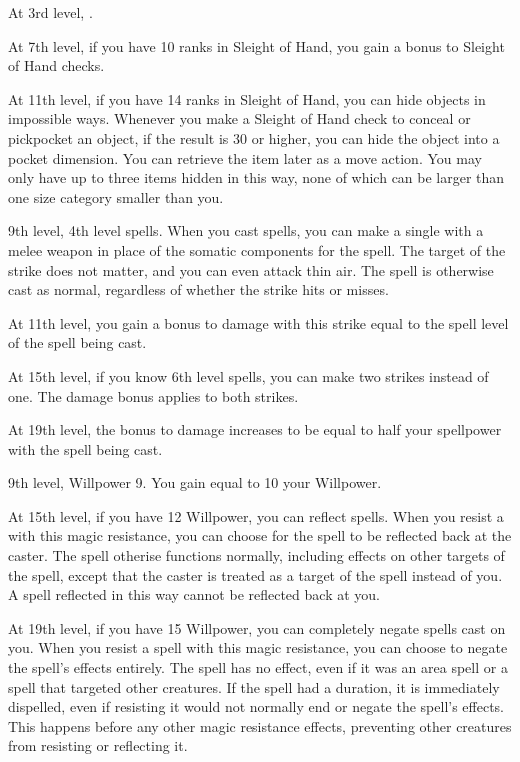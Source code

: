     At 3rd level, \tdash.

    At 7th level, if you have 10 ranks in Sleight of Hand, you gain a  bonus to Sleight of Hand checks.

    At 11th level, if you have 14 ranks in Sleight of Hand, you can hide objects in impossible ways.
    Whenever you make a Sleight of Hand check to conceal or pickpocket an object, if the result is 30 or higher, you can hide the object into a pocket dimension.
    You can retrieve the item later as a move action.
    You may only have up to three items hidden in this way, none of which can be larger than one size category smaller than you.
    \magical

    \featpres 9th level, 4th level spells.
    \featben When you cast spells, you can make a single  with a melee weapon in place of the somatic components for the spell.
    The target of the strike does not matter, and you can even attack thin air.
    The spell is otherwise cast as normal, regardless of whether the strike hits or misses.

    At 11th level, you gain a bonus to damage with this strike equal to the spell level of the spell being cast.

    At 15th level, if you know 6th level spells, you can make two strikes instead of one.
    The damage bonus applies to both strikes.

    At 19th level, the bonus to damage increases to be equal to half your spellpower with the spell being cast.

    \featpres 9th level, Willpower 9.
    \featben You gain  equal to 10 \add your Willpower.

    At 15th level, if you have 12 Willpower, you can reflect spells.
    When you resist a  with this magic resistance, you can choose for the spell to be reflected back at the caster.
    The spell otherise functions normally, including effects on other targets of the spell, except that the caster is treated as a target of the spell instead of you.
    A spell reflected in this way cannot be reflected back at you.

    At 19th level, if you have 15 Willpower, you can completely negate spells cast on you.
    When you resist a spell with this magic resistance, you can choose to negate the spell's effects entirely.
    The spell has no effect, even if it was an area spell or a spell that targeted other creatures.
    If the spell had a duration, it is immediately dispelled, even if resisting it would not normally end or negate the spell's effects.
    This happens before any other magic resistance effects, preventing other creatures from resisting or reflecting it.

